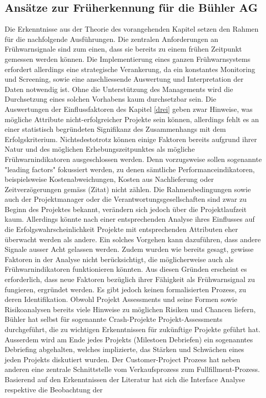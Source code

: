 \subsection{Ansätze zur Früherkennung für die Bühler AG}\label{vierzwei}
Die Erkenntnisse aus der Theorie des vorangehenden Kapitel setzen den Rahmen für die nachfolgende Ausführungen. Die zentralen Anforderungen an Frühwarnsignale sind zum einen, dass sie bereits zu einem frühen Zeitpunkt gemessen werden können. Die Implementierung eines ganzen Frühwarnsystems erfordert allerdings eine strategische Verankerung, da ein konstantes Monitoring und Screening, sowie eine anschliessende Auswertung und Interpretation der Daten notwendig ist. Ohne die Unterstützung des Managements wird die Durchsetzung eines solchen Vorhabens kaum durchsetzbar sein.
Die Auswertungen der Einflussfaktoren des Kapitel \ref{drei} geben zwar Hinweise, was mögliche Attribute nicht-erfolgreicher Projekte sein können, allerdings fehlt es an einer statistisch begründeten Signifikanz des Zusammenhangs mit dem Erfolgskriterium. Nichtsdestotrotz können einige Faktoren bereits aufgrund ihrer Natur und des möglichen Erhebungszeitpunktes als mögliche Frühwarnindikatoren ausgeschlossen werden. Denn vorzugsweise sollen sogenannte "leading factors" fokussiert werden, zu denen sämtliche Performanceindikatoren, beispielsweise Kostenabweichungen, Kosten aus Nachlieferung oder Zeitverzögerungen gemäss (Zitat) nicht zählen. Die Rahmenbedingungen sowie auch der Projektmanager oder die Verantwortungsgesellschaften sind zwar zu Beginn des Projektes bekannt, verändern sich jedoch über die Projektlaufzeit kaum. Allerdings könnte nach einer entsprechenden Analyse ihres Einflusses auf die Erfolgswahrscheinlichkeit Projekte mit entsprechenden Attributen eher überwacht werden als andere. Ein solches Vorgehen kann dazuführen, dass andere Signale ausser Acht gelassen werden. Zudem wurden wie bereits gesagt, gewisse Faktoren in der Analyse nicht berücksichtigt, die möglicherweise auch als Frühwarnindikatoren funktionieren könnten. Aus diesen Gründen erscheint es erforderlich, dass neue Faktoren bezüglich ihrer Fähigkeit als Frühwarnsignal zu fungieren, ergründet werden. Es gibt jedoch keinen formalisierten Prozess, zu deren Identifikation. 
\newline Obwohl Projekt Assessments und seine Formen sowie Risikoanalysen bereits viele Hinweise zu möglichen Risiken und Chancen liefern, 
Bühler hat selbst für sogenannte Crash-Projekte Projekt-Assessments durchgeführt, die zu wichtigen Erkenntnissen für zukünftige Projekte geführt hat. Ausserdem wird am Ende jedes Projekts (Milestoen Debriefen) ein sogenanntes Debriefing abgehalten, welches implizierte, das Stärken und Schwächen eines jeden Projekts diskutiert wurden. Der Customer-Project Prozess hat neben anderen eine zentrale Schnittstelle vom Verkaufsprozess zum Fullfillment-Prozess. Basierend auf den Erkenntnissen der Literatur hat sich die Interface Analyse respektive die Beobachtung der
